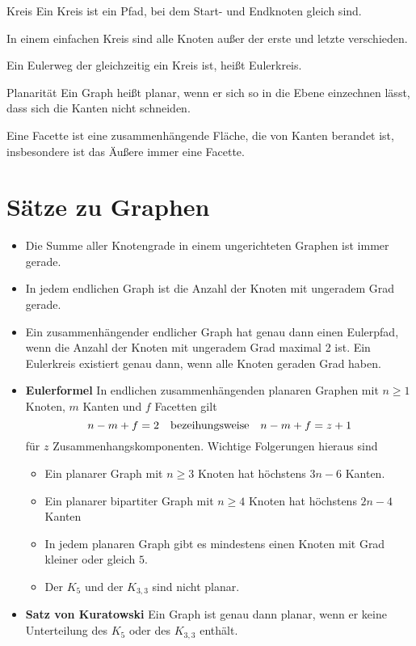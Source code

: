 \begin{definition}{Kreis}
	Ein Kreis ist ein Pfad, bei dem Start- und Endknoten gleich sind.

	In einem einfachen Kreis sind alle Knoten außer der erste und letzte verschieden.
\end{definition}
Ein Eulerweg der gleichzeitig ein Kreis ist, heißt Eulerkreis.

\begin{definition}{Planarität}
	Ein Graph heißt planar, wenn er sich so in die Ebene einzechnen lässt, dass sich die Kanten nicht schneiden.
\end{definition}

Eine Facette ist eine zusammenhängende Fläche, die von Kanten berandet ist, insbesondere ist das Äußere immer eine Facette.

\section{Sätze zu Graphen}
\begin{itemize}
	\item Die Summe aller Knotengrade in einem ungerichteten Graphen ist immer gerade.
	\item In jedem endlichen Graph ist die Anzahl der Knoten mit ungeradem Grad gerade.
	\item Ein zusammenhängender endlicher Graph hat genau dann einen Eulerpfad, wenn die Anzahl der Knoten mit ungeradem Grad maximal 2 ist. Ein Eulerkreis existiert genau dann, wenn alle Knoten geraden Grad haben.
	\item \textbf{Eulerformel} In endlichen zusammenhängenden planaren Graphen mit $n\geq 1$ Knoten, $m$ Kanten und $f$ Facetten gilt
	\begin{equation*}
		n-m+f=2\text{\quad bezeihungsweise\quad}n-m+f=z+1
	\end{equation*}
	für $z$ Zusammenhangskomponenten.
	Wichtige Folgerungen hieraus sind
	\begin{itemize}
		\item Ein planarer Graph mit $n\geq 3$ Knoten hat höchstens $3n-6$ Kanten.
		\item Ein planarer bipartiter Graph mit $n\geq 4$ Knoten hat höchstens $2n-4$ Kanten
		\item In jedem planaren Graph gibt es mindestens einen Knoten mit Grad kleiner oder gleich $5$.
		\item Der $K_5$ und der $K_{3,3}$ sind nicht planar.
	\end{itemize}

	\item \textbf{Satz von Kuratowski} Ein Graph ist genau dann planar, wenn er keine Unterteilung des $K_5$ oder des $K_{3,3}$ enthält.
\end{itemize}

